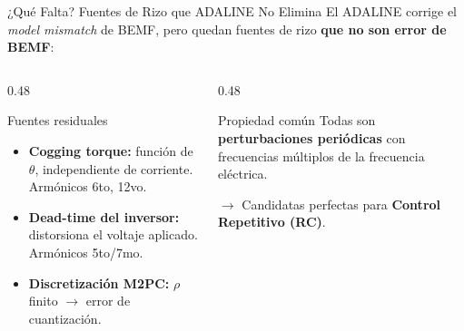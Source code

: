 \begin{frame}{¿Qué Falta? Fuentes de Rizo que ADALINE No Elimina}
    El ADALINE corrige el \textit{model mismatch} de BEMF, pero quedan fuentes de rizo \textbf{que no son error de BEMF}:
    
    \vspace{0.3cm}
    
    \begin{columns}[T]
    \begin{column}{0.48\textwidth}
        \begin{alertblock}{Fuentes residuales}
            \begin{itemize}
                \item \textbf{Cogging torque:} función de $\theta$, independiente de corriente. Armónicos 6to, 12vo.
                \item \textbf{Dead-time del inversor:} distorsiona el voltaje aplicado. Armónicos 5to/7mo.
                \item \textbf{Discretización M2PC:} $\rho$ finito $\rightarrow$ error de cuantización.
            \end{itemize}
        \end{alertblock}
    \end{column}
    \begin{column}{0.48\textwidth}
        \begin{exampleblock}{Propiedad común}
            Todas son \textbf{perturbaciones periódicas} con frecuencias múltiplos de la frecuencia eléctrica.
            
            \vspace{0.3cm}
            
            $\rightarrow$ Candidatas perfectas para \textbf{Control Repetitivo (RC)}.
        \end{exampleblock}
    \end{column}
    \end{columns}
\end{frame}

